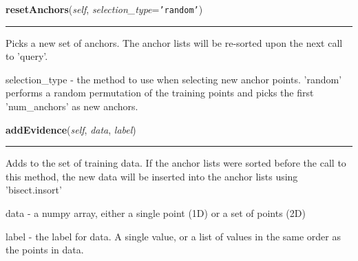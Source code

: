     \label{QSTK:qstklearn:fastknn:FastKNN:resetAnchors}

    \vspace{0.5ex}

\hspace{.8\funcindent}\begin{boxedminipage}{\funcwidth}

    \raggedright \textbf{resetAnchors}(\textit{self}, \textit{selection\_type}={\tt \texttt{'}\texttt{random}\texttt{'}})

    \vspace{-1.5ex}

    \rule{\textwidth}{0.5\fboxrule}
\setlength{\parskip}{2ex}
    Picks a new set of anchors.  The anchor lists will be re-sorted upon 
    the next call to 'query'.

    selection\_type - the method to use when selecting new anchor points. 
    'random' performs a random permutation of the training points and picks
    the first 'num\_anchors' as new anchors.

\setlength{\parskip}{1ex}
    \end{boxedminipage}

    \label{QSTK:qstklearn:fastknn:FastKNN:addEvidence}

    \vspace{0.5ex}

\hspace{.8\funcindent}\begin{boxedminipage}{\funcwidth}

    \raggedright \textbf{addEvidence}(\textit{self}, \textit{data}, \textit{label})

    \vspace{-1.5ex}

    \rule{\textwidth}{0.5\fboxrule}
\setlength{\parskip}{2ex}
    Adds to the set of training data. If the anchor lists were sorted 
    before the call to this method, the new data will be inserted into the 
    anchor lists using 'bisect.insort'

    data - a numpy array, either a single point (1D) or a set of points 
    (2D)

    label - the label for data. A single value, or a list of values in the 
    same order as the points in data.

\setlength{\parskip}{1ex}
    \end{boxedminipage}

